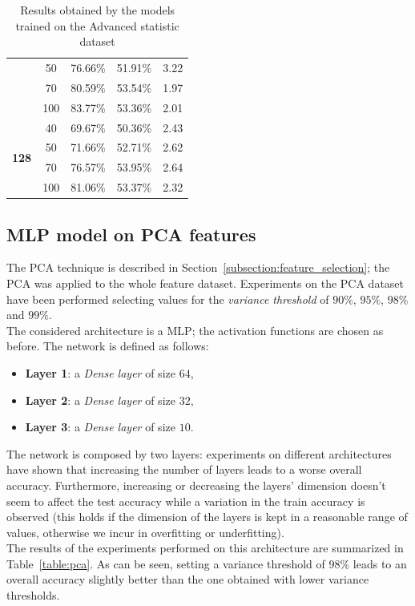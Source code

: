 \documentclass[oneside,openany]{article}
\begin{document}
\begin{table}[ht]
{\begin{tabular}{|c|c|c|c|c|}
        & 50 & 76.66\% & 51.91\% & 3.22\\
        & 70 & 80.59\% & 53.54\% & 1.97\\
        & 100 & 83.77\% & 53.36\% & 2.01\\
        \hline
        \multirow{4}{4em}{\centering \textbf{128}}  & 40 & 69.67\% & 50.36\% & 2.43\\
        & 50 & 71.66\% & 52.71\% & 2.62\\
        & 70 & 76.57\% & 53.95\% & 2.64\\
        & 100 & 81.06\% & 53.37\% & 2.32\\
        \hline
        \end{tabular}
        }
        \caption{Results obtained by the models trained on the Advanced statistic dataset}
        \label{table:adv}
    \end{table}
    \subsection{MLP model on PCA features}
    \label{subsection:pca_model}
    The PCA technique is described in Section~\ref{subsection:feature_selection}; the PCA was applied to the whole feature dataset.
    Experiments on the PCA dataset have been performed selecting values for the \textit{variance threshold} of $90\%$, $95\%$, $98\%$ and $99\%$. \\
    The considered architecture is a MLP; the activation functions are chosen as before. The network is defined as follows:
    \begin{itemize}
    \item \textbf{Layer 1}: a \textit{Dense layer} of size $64$,
    \item \textbf{Layer 2}: a \textit{Dense layer} of size $32$,
    \item \textbf{Layer 3}: a \textit{Dense layer} of size $10$.
    \end{itemize}
    The network is composed by two layers: experiments on different architectures have shown that increasing the number of layers leads to a worse overall accuracy. Furthermore, increasing or decreasing the layers' dimension doesn't seem to affect the test accuracy while a variation in the train accuracy is observed (this holds if the dimension of the layers is kept in a reasonable range of values, otherwise we incur in overfitting or underfitting).\\
    The results of the experiments performed on this architecture are summarized in Table~\ref{table:pca}. As can be seen, setting a variance threshold of $98\%$ leads to an overall accuracy slightly better than the one obtained with lower variance thresholds.
    
\end{document}

